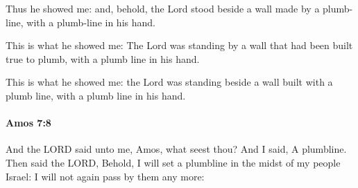 			\begin{versebox}
					\item[BHS] 
					\item[LXX] 
					\item[ASV] Thus he showed me: and, behold, the Lord stood beside a wall made by a plumb-line, with a plumb-line in his hand.
					\item[NIV] This is what he showed me: The Lord was standing by a wall that had been built true to plumb, with a plumb line in his hand.
					\item[NRSV] This is what he showed me: the Lord was standing beside a wall built with a plumb line, with a plumb line in his hand.
			\end{versebox}

		\paragraph{Amos 7:8} %
			\label{AMOS-7-8}

			And the LORD said unto me, Amos, what seest thou? And I said, A plumbline. Then said the LORD, Behold, I will set a plumbline in the midst of my people Israel: I will not again pass by them any more:

